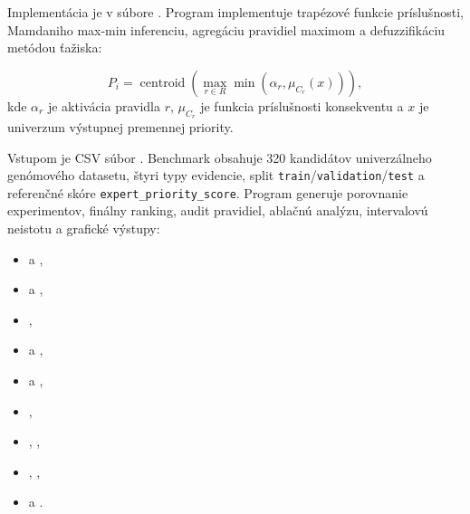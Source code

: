 \documentclass[12pt,a4paper]{article}
\begin{document}
Implementácia je v súbore . Program implementuje trapézové funkcie príslušnosti, Mamdaniho max-min inferenciu, agregáciu pravidiel maximom a defuzzifikáciu metódou ťažiska:

\[
P_i = \operatorname{centroid}\left(\max_{r \in R} \min(\alpha_r, \mu_{C_r}(x))\right),
\]
kde $\alpha_r$ je aktivácia pravidla $r$, $\mu_{C_r}$ je funkcia príslušnosti konsekventu a $x$ je univerzum výstupnej premennej priority.

Vstupom je CSV súbor . Benchmark obsahuje 320 kandidátov univerzálneho genómového datasetu, štyri typy evidencie, split \texttt{train}/\texttt{validation}/\texttt{test} a referenčné skóre \texttt{expert\_priority\_score}. Program generuje porovnanie experimentov, finálny ranking, audit pravidiel, ablačnú analýzu, intervalovú neistotu a grafické výstupy:

\begin{itemize}
  \item {} a ,
  \item {} a ,
  \item {},
  \item {} a ,
  \item {} a ,
  \item {},
  \item {}, ,
  \item {}, ,
  \item {} a .
\end{itemize}
\end{document}

